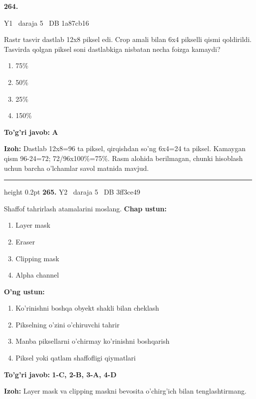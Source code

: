 \documentclass[10pt,a4paper,oneside]{article}
\begin{document}
\hypertarget{q264}{\textbf{\color{ink}264.}}  {\color{muted}\scriptsize Y1 \textbullet\ daraja 5 \textbullet\ DB 1a87cb16}
\par
Rastr tasvir dastlab 12x8 piksel edi. Crop amali bilan 6x4 pikselli qismi qoldirildi. Tasvirda qolgan piksel soni dastlabkiga nisbatan necha foizga kamaydi?
\begin{enumerate}[label=\Alph*),leftmargin=9mm]
\item 75\%
\item 50\%
\item 25\%
\item 150\%
\end{enumerate}
\begin{tcolorbox}[enhanced,breakable,colback=teal!4,colframe=teal!45!black,boxrule=0.45pt,arc=1.2mm,left=2.8mm,right=2.8mm,top=2mm,bottom=2mm,before skip=2mm,after skip=2mm]
\textbf{\color{teal}To'g'ri javob:} \textbf{A}
\par\smallskip
\textbf{Izoh:} Dastlab 12x8=96 ta piksel, qirqishdan so'ng 6x4=24 ta piksel. Kamaygan qism 96-24=72; 72/96x100\%=75\%. Rasm alohida berilmagan, chunki hisoblash uchun barcha o'lchamlar savol matnida mavjud.
\end{tcolorbox}
\vspace{2mm}\hrule height 0.2pt \vspace{4mm}
\hypertarget{q265}{\textbf{\color{ink}265.}}  {\color{muted}\scriptsize Y2 \textbullet\ daraja 5 \textbullet\ DB 3ff3ce49}
\par
Shaffof tahrirlash atamalarini moslang.
\textbf{\footnotesize Chap ustun:}
\begin{enumerate}[label=\arabic*),leftmargin=9mm]
\item Layer mask
\item Eraser
\item Clipping mask
\item Alpha channel
\end{enumerate}
\textbf{\footnotesize O'ng ustun:}
\begin{enumerate}[label=\Alph*),leftmargin=9mm]
\item Ko'rinishni boshqa obyekt shakli bilan cheklash
\item Pikselning o'zini o'chiruvchi tahrir
\item Manba piksellarni o'chirmay ko'rinishni boshqarish
\item Piksel yoki qatlam shaffofligi qiymatlari
\end{enumerate}
\begin{tcolorbox}[enhanced,breakable,colback=teal!4,colframe=teal!45!black,boxrule=0.45pt,arc=1.2mm,left=2.8mm,right=2.8mm,top=2mm,bottom=2mm,before skip=2mm,after skip=2mm]
\textbf{\color{teal}To'g'ri javob:} \textbf{1-C, 2-B, 3-A, 4-D}
\par\smallskip
\textbf{Izoh:} Layer mask va clipping maskni bevosita o'chirg'ich bilan tenglashtirmang.
\end{tcolorbox}
\end{document}
